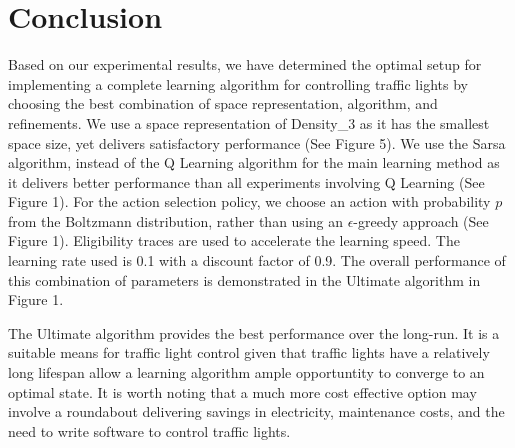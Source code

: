 \section {Conclusion}

Based on our experimental results, we have determined the optimal setup for
implementing a complete learning algorithm for controlling traffic lights by
choosing the best combination of space representation, algorithm, and
refinements. We use a space representation of Density\_3 as it has the smallest
space size, yet delivers satisfactory performance (See Figure 5). We use the
Sarsa algorithm, instead of the Q Learning algorithm for the main learning
method as it delivers better performance than all experiments involving Q
Learning (See Figure 1). For the action selection policy, we choose an action
with probability $p$ from the Boltzmann distribution, rather than using an
$\epsilon$-greedy approach (See Figure 1). Eligibility traces are used to
accelerate the learning speed. The learning rate used is 0.1 with a discount
factor of 0.9. The overall performance of this combination of parameters is
demonstrated in the Ultimate algorithm in Figure 1.

The Ultimate algorithm provides the best performance over the long-run. It is a
suitable means for traffic light control given that traffic lights have a
relatively long lifespan allow a learning algorithm ample opportuntity to
converge to an optimal state. It is worth noting that a much more cost effective
option may involve a roundabout delivering savings in electricity, maintenance
costs, and the need to write software to control traffic lights.
